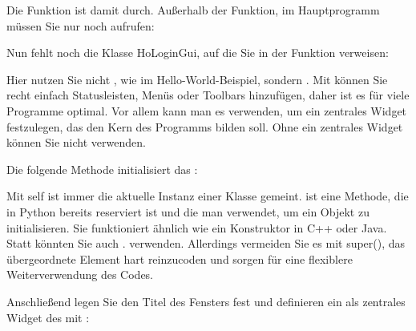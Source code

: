 \medskip
    

\medskip

Die Funktion  ist damit durch. Außerhalb der Funktion, im Hauptprogramm müssen Sie  nur noch aufrufen:

\medskip
    

\medskip

Nun fehlt noch die Klasse HoLoginGui, auf die Sie in der Funktion  verweisen:
    
\medskip


\medskip

Hier nutzen Sie nicht , wie im Hello-World-Beispiel, sondern . Mit  können Sie recht einfach Statusleisten, Menüs oder Toolbars hinzufügen, daher ist es für viele Programme optimal. Vor allem kann man es verwenden, um ein zentrales Widget festzulegen, das den Kern des Programms bilden soll. Ohne ein zentrales Widget können Sie  nicht verwenden.
    
Die folgende Methode initialisiert das :
    
\medskip



\medskip

Mit self ist immer die aktuelle Instanz einer Klasse gemeint.  ist eine Methode, die in Python bereits reserviert ist und die man verwendet, um ein Objekt zu initialisieren. Sie funktioniert ähnlich wie ein Konstruktor in C++ oder Java. Statt  könnten Sie auch . verwenden. Allerdings vermeiden Sie es mit super(), das übergeordnete Element hart reinzucoden und sorgen für eine flexiblere Weiterverwendung des Codes.
    
Anschließend legen Sie den Titel des Fensters fest und definieren ein  als zentrales Widget des  mit :

\medskip
    



